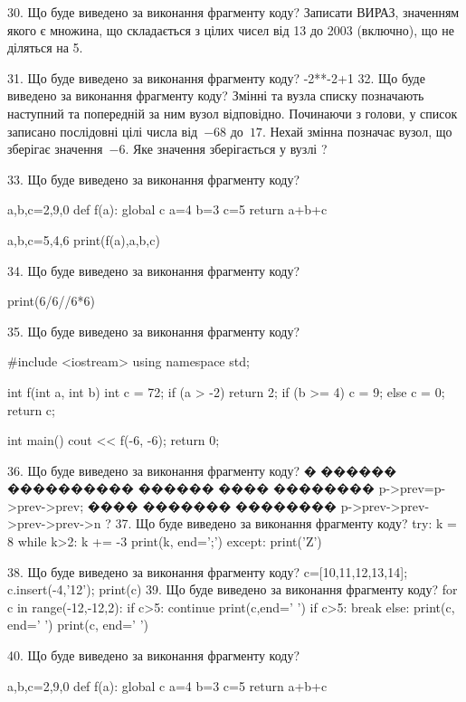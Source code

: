 \documentclass[11pt]{article}
\begin{document}
30. Що буде виведено за виконання фрагменту коду?
Записати ВИРАЗ, значенням якого є множина, що складається з цілих чисел від 13 до 2003 (включно), що не діляться на 5.

31. Що буде виведено за виконання фрагменту коду?
-2**-2+1
32. Що буде виведено за виконання фрагменту коду?
Змінні  та  вузла списку позначають наступний та попередній за ним вузол відповідно. Починаючи з голови, у список записано послідовні цілі числа від~$-68$ до~$17$. Нехай змінна  позначає вузол, що зберігає значення~$-6$.
Яке значення зберігається у вузлі  ?

33. Що буде виведено за виконання фрагменту коду?

a,b,c=2,9,0
def f(a):
global c    a=4
    b=3
    c=5
    return a+b+c

a,b,c=5,4,6
print(f(a),a,b,c)

34. Що буде виведено за виконання фрагменту коду?

print(6/6//6*6)

35. Що буде виведено за виконання фрагменту коду?

#include <iostream>
using namespace std;

int f(int a, int b){
    int c = 72;
    if (a > -2)
        return 2;
    if (b >= 4)
         c = 9;
    else 
        c = 0;
    return c;
}

int main(){
    cout << f(-6, -6);
    return 0;
}

36. Що буде виведено за виконання фрагменту коду?
� ������ ���������� ������ ���� �������� p->prev=p->prev->prev;
���� ������� �������� p->prev->prev->prev->prev->n ?
37. Що буде виведено за виконання фрагменту коду?
try:
    k = 8
    while k>2:
        k += -3
    print(k, end=';')
except:
    print('Z')

38. Що буде виведено за виконання фрагменту коду?
c=[10,11,12,13,14]; c.insert(-4,'12'); print(c)
39. Що буде виведено за виконання фрагменту коду?
for c in range(-12,-12,2):
    if c>5:
        continue
        print(c,end=' ')
    if c>5:
        break
else:
    print(c, end=' ')
print(c, end=' ')

40. Що буде виведено за виконання фрагменту коду?

a,b,c=2,9,0
def f(a):
global c    a=4
    b=3
    c=5
    return a+b+c
\end{document}
